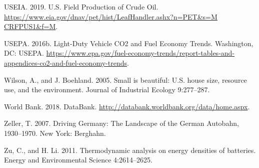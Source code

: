 \documentclass[aps,rmp,preprint,superscriptaddress,10pt,onecolumn]{article}
\begin{document}
USEIA. 2019. U.S. Field Production of Crude Oil. \url{https://www.eia.gov/dnav/pet/hist/LeafHandler.ashx?n​=P​ET&s​=M​ CRFPUS1&f​=​M}.\par
USEPA. 2016b. Light-Duty Vehicle CO2 and Fuel Economy Trends. Washington, DC: USEPA. \url{https://www.epa.gov/fuel-economy-trends/report-tables-and-appendices-co2-and-fuel-economy-trends}.\par
Wilson, A., and J. Boehland. 2005. Small is beautiful: U.S. house size, resource use, and the environment. Journal of Industrial Ecology 9:277–287.\par
World Bank. 2018. DataBank. \url{http://databank.worldbank.org/data/home.aspx}.\par
Zeller, T. 2007. Driving Germany: The Landscape of the German Autobahn, 1930–1970. New York: Berghahn.\par
Zu, C., and H. Li. 2011. Thermodynamic analysis on energy densities of batteries. Energy and Environmental Science 4:2614–2625.\par
\end{document}
